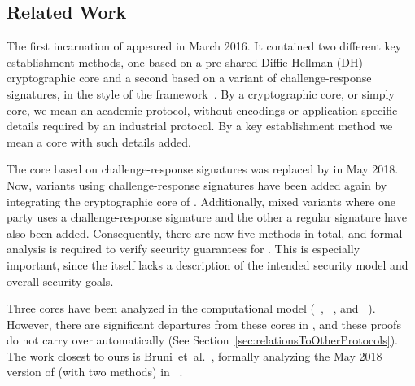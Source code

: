 \documentclass[runningheads, envcountsame, hidelinks, a4paper, x11names]{llncs}
\begin{document}
\subsection{Related Work}
\label{sec:relatedWork}
%
The first incarnation of \mEdhoc{} appeared in March 2016.
%
It contained two different key establishment methods, one based on a
pre-shared Diffie-Hellman (DH) cryptographic core and a second based on a
variant of challenge-response signatures, in the style of the \mNoise{}
framework~\cite{perrin2016noise}.
%
By a cryptographic core, or simply core, we mean an academic protocol, without
encodings or application specific details required by an industrial protocol.
%
By a key establishment method we mean a core with such details added.
%

The core based on challenge-response signatures was replaced by \mSigma{}
in May 2018.
%
Now, variants using challenge-response signatures have been added again by
integrating the cryptographic core of \mOptls{}.
%
Additionally, mixed variants where one party uses a challenge-response
signature and the other a regular signature have also been added.
%
Consequently, there are now five methods in total, and formal analysis is
required to verify security guarantees for \mEdhoc.
%
This is especially important, since the \mSpec{} itself lacks a description
of the intended security model and overall security goals.
%

Three cores have been analyzed in the computational model (\mSigma{}~\cite{DBLP:conf/crypto/CanettiK02},
\mOptls{}~\cite{DBLP:conf/eurosp/KrawczykW16}, and
\mNoise{}~\cite{DBLP:conf/eurosp/KobeissiNB19}).
%
However, there are significant departures from these cores in \mEdhoc, and
these proofs do not carry over automatically
(See Section~\ref{sec:relationsToOtherProtocols}).
%
The work closest to ours is Bruni~et~al.~\cite{DBLP:conf/secsr/BruniJPS18},
formally analyzing the May 2018 version of \mEdhoc{} (with two methods) in
\mProverif~\cite{DBLP:conf/csfw/Blanchet01}.
%

%
\end{document}
